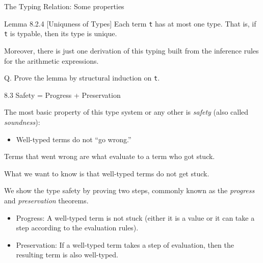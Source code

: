 \documentclass[table]{beamer}
\begin{document}
\begin{frame}[t]{The Typing Relation: Some properties} \vspace{10pt}

Lemma 8.2.4 [Uniquness of Types] Each term \texttt{t} has at most one type. That is, if \texttt{t} is typable, then its type is unique. 

\vspace{10pt}

Moreover, there is just one derivation of this typing built from the inference rules for the arithmetic expressions.

\vspace{10pt}

Q. Prove the lemma by structural induction on \texttt{t}.

\end{frame}


\begin{frame}[t]{8.3 Safety = Progress + Preservation} \vspace{10pt}

The most basic property of this type system or any other is {\it safety} (also called {\it soundness}):
\begin{itemize}
\item Well-typed terms do not ``go wrong.''
\end{itemize}

\vspace{10pt}

Terms that went wrong are what evaluate to a term who got stuck.

\vspace{10pt}

What we want to know is that well-typed terms do not get stuck. 

\vspace{10pt}

We show the type safety by proving two steps, commonly known as the {\it progress} and {\it preservation} theorems.

\begin{itemize}
\item Progress: A well-typed term is not stuck (either it is a value or it can take a step according to the evaluation rules).
\item Preservation: If a well-typed term takes a step of evaluation, then the resulting term is also well-typed.
\end{itemize}

\end{frame}
\end{document}
